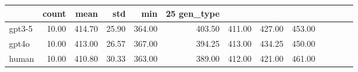 \begin{tabular}{lrrrrrrrr}
\toprule
 & count & mean & std & min & 25%
gen_type &  &  &  &  &  &  &  &  \\
\midrule
gpt3-5 & 10.00 & 414.70 & 25.90 & 364.00 & 403.50 & 411.00 & 427.00 & 453.00 \\
gpt4o & 10.00 & 413.00 & 26.57 & 367.00 & 394.25 & 413.00 & 434.25 & 450.00 \\
human & 10.00 & 410.80 & 30.33 & 363.00 & 389.00 & 412.00 & 421.00 & 461.00 \\
\bottomrule
\end{tabular}
